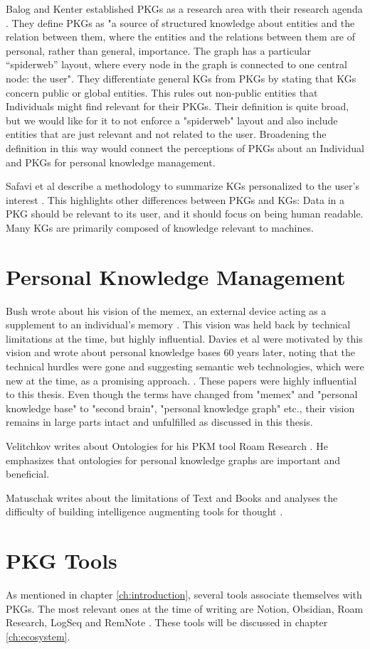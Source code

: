 Balog and Kenter established PKGs as a research area with their research agenda \cite{Balog2019PKGAgenda}. They define PKGs as "a source of structured knowledge about entities and the relation between them, where the entities and the relations between them are of personal, rather than general, importance. The graph has a particular “spiderweb” layout, where every node in the graph is connected to one central node: the user". They differentiate general KGs from PKGs by stating that KGs concern public or global entities. This rules out non-public entities that Individuals might find relevant for their PKGs. Their definition is quite broad, but we would like for it to not enforce a "spiderweb" layout and also include entities that are just relevant and not related to the user. Broadening the definition in this way would connect the perceptions of PKGs about an Individual and PKGs for personal knowledge management.

Safavi et al describe a methodology to summarize KGs personalized to the user's interest \cite{Safavi2019PKGSum}. This highlights other differences between PKGs and KGs: Data in a PKG should be relevant to its user, and it should focus on being human readable. Many KGs are primarily composed of knowledge relevant to machines.
    

\section{Personal Knowledge Management}
Bush wrote about his vision of the memex, an external device acting as a  supplement to an individual's memory \cite{Bush1945Memex}. This vision was held back by technical limitations at the time, but highly influential. Davies et al were motivated by this vision and wrote about personal knowledge bases 60 years later, noting that the technical hurdles were gone and suggesting semantic web technologies, which were new at the time, as a promising approach. \cite{Davies2005Memex60}. These papers were highly influential to this thesis. Even though the terms have changed from "memex" and "personal knowledge base" to "second brain", "personal knowledge graph" etc., their vision remains in large parts intact and unfulfilled as discussed in this thesis.

Velitchkov writes about Ontologies for his PKM tool Roam Research \cite{roamOntologies}. He emphasizes that ontologies for personal knowledge graphs are important and beneficial.

Matuschak writes about the limitations of Text and Books and analyses the difficulty of building intelligence augmenting tools for thought \cite{Matuschak2019TTFT}.

\section{PKG Tools}

As mentioned in chapter \ref{ch:introduction}, several tools associate themselves with PKGs. The most relevant ones at the time of writing are Notion, Obsidian, Roam Research, LogSeq and RemNote \cite{notion, roam, obsidian, logseq, remnote}. These tools will be discussed in chapter \ref{ch:ecosystem}.